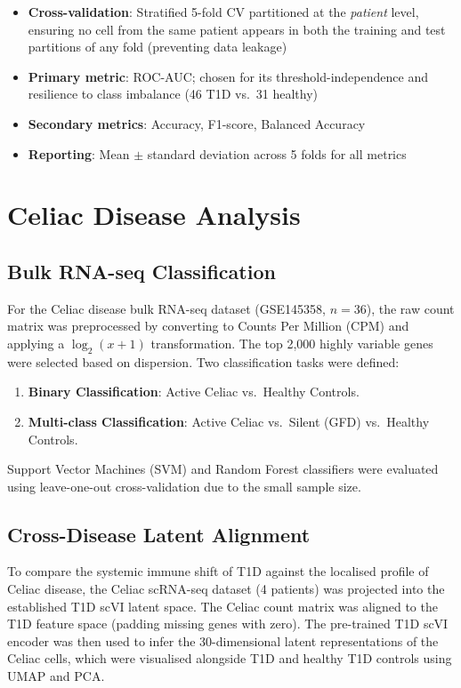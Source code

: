 \begin{itemize}
    \item \textbf{Cross-validation}: Stratified 5-fold CV partitioned at the \emph{patient} level, ensuring no cell from the same patient appears in both the training and test partitions of any fold (preventing data leakage)
    \item \textbf{Primary metric}: ROC-AUC; chosen for its threshold-independence and resilience to class imbalance (46 T1D vs.\ 31 healthy)~\cite{yazar2022single}
    \item \textbf{Secondary metrics}: Accuracy, F1-score, Balanced Accuracy
    \item \textbf{Reporting}: Mean $\pm$ standard deviation across 5 folds for all metrics
\end{itemize}

\section{Celiac Disease Analysis}

\subsection{Bulk RNA-seq Classification}

For the Celiac disease bulk RNA-seq dataset (GSE145358, $n=36$), the raw count matrix was preprocessed by converting to Counts Per Million (CPM) and applying a $\log_2(x+1)$ transformation. The top 2,000 highly variable genes were selected based on dispersion. Two classification tasks were defined:
\begin{enumerate}
    \item \textbf{Binary Classification}: Active Celiac vs.\ Healthy Controls.
    \item \textbf{Multi-class Classification}: Active Celiac vs.\ Silent (GFD) vs.\ Healthy Controls.
\end{enumerate}
Support Vector Machines (SVM) and Random Forest classifiers were evaluated using leave-one-out cross-validation due to the small sample size.

\subsection{Cross-Disease Latent Alignment}

To compare the systemic immune shift of T1D against the localised profile of Celiac disease, the Celiac scRNA-seq dataset (4 patients) was projected into the established T1D scVI latent space. The Celiac count matrix was aligned to the T1D feature space (padding missing genes with zero). The pre-trained T1D scVI encoder was then used to infer the 30-dimensional latent representations of the Celiac cells, which were visualised alongside T1D and healthy T1D controls using UMAP and PCA.
